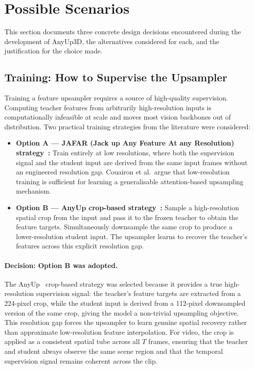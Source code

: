 \section{Possible Scenarios}

This section documents three concrete design decisions encountered during the 
development of AnyUp3D, the alternatives considered for each, and the 
justification for the choice made.

\subsection{Training: How to Supervise the Upsampler}

Training a feature upsampler requires a source of high-quality supervision.
Computing teacher features from arbitrarily high-resolution inputs is
computationally infeasible at scale and moves most vision backbones
out of distribution. Two practical training strategies from the literature
were considered:

\begin{itemize}
    \item \textbf{Option A --- JAFAR (Jack up Any Feature At any Resolution) strategy~\cite{couairon2025}:} Train entirely
    at low resolutions, where both the supervision signal and the student input are
    derived from the same input frames without an engineered resolution gap.
    Couairon et al.\ argue that low-resolution training is sufficient for learning
    a generalisable attention-based upsampling mechanism.
    \item \textbf{Option B --- AnyUp crop-based strategy~\cite{anyup}:} Sample a
    high-resolution spatial crop from the input and pass it to the frozen teacher
    to obtain the feature targets. Simultaneously downsample the same crop to
    produce a lower-resolution student input. The upsampler learns to recover the
    teacher's features across this explicit resolution gap.
\end{itemize}

\paragraph{Decision: Option B was adopted.}
The AnyUp~\cite{anyup} crop-based strategy was selected because it provides a true
high-resolution supervision signal: the teacher's feature targets are extracted from
a 224-pixel crop, while the student input is derived from a 112-pixel downsampled
version of the same crop, giving the model a non-trivial upsampling objective.
This resolution gap forces the upsampler to learn genuine spatial recovery rather
than approximate low-resolution feature interpolation. For video, the crop is applied
as a consistent spatial tube across all $T$ frames, ensuring that the teacher and
student always observe the same scene region and that the temporal supervision signal
remains coherent across the clip.

